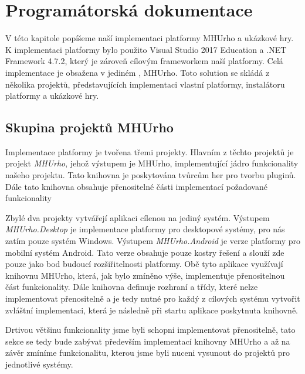 \chapter{Programátorská dokumentace}
V této kapitole popíšeme naší implementaci platformy MHUrho a ukázkové hry. K implementaci platformy bylo použito Visual Studio 2017 Education a .NET Framework 4.7.2, který je zároveň cílovým frameworkem naší platformy. Celá implementace je obsažena v jediném , MHUrho. Toto solution se skládá z několika projektů, představujících implementaci vlastní platformy, instalátoru platformy a ukázkové hry.

\section{Skupina projektů MHUrho}
Implementace platformy je tvořena třemi projekty. Hlavním z těchto projektů je projekt \textit{MHUrho}, jehož výstupem je  MHUrho, implementující jádro funkcionality našeho projektu. Tato knihovna je poskytována tvůrcům her pro tvorbu pluginů. Dále tato knihovna obsahuje přenositelné části implementací požadované funkcionality 

Zbylé dva projekty vytvářejí aplikaci cílenou na jediný systém. Výstupem \textit{MHUrho.Desktop} je implementace platformy pro desktopové systémy, pro nás zatím pouze systém Windows. Výstupem \textit{MHUrho.Android} je verze platformy pro mobilní systém Android. Tato verze obsahuje pouze kostry řešení a slouží zde pouze jako bod budoucí rozšiřitelnosti platformy. Obě tyto aplikace využívají knihovnu MHUrho, která, jak bylo zmíněno výše, implementuje přenositelnou část funkcionality. Dále knihovna definuje rozhraní a třídy, které nelze implementovat přenositelně a je tedy nutné pro každý z cílových systému vytvořit zvláštní implementaci, která je následně při startu aplikace poskytnuta knihovně.

Drtivou většinu funkcionality jsme byli schopni implementovat přenositelně, tato sekce se tedy bude zabývat především implementací knihovny MHUrho a až na závěr zmíníme funkcionalitu, kterou jsme byli nuceni vysunout do projektů pro jednotlivé systémy.

